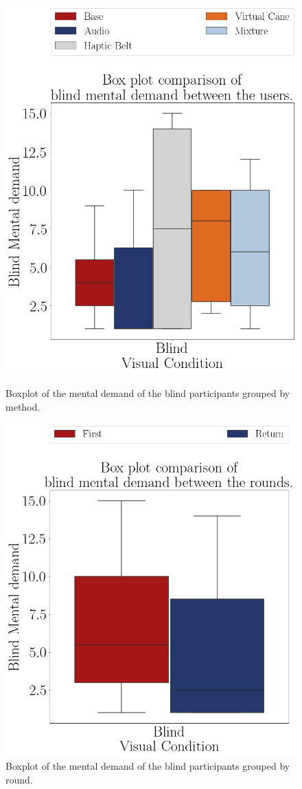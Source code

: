\begin{figure}[!htb]
    \centering
    \begin{minipage}{0.45\textwidth}
        \centering
        \includegraphics[width = 0.8\linewidth]{Resultados/Nasa/Figuras/png/boxplot_md_blind_scene.png}
        \caption{Boxplot of the mental demand of the blind participants grouped by method.}
        \label{fig:boxplot_md_blind_scene}
    \end{minipage}
    \begin{minipage}{0.45\textwidth}
        \centering
        \includegraphics[width = 0.8\linewidth]{Resultados/Nasa/Figuras/png/boxplot_md_blind_rounds.png}
        \caption{Boxplot of the mental demand of the blind participants grouped by round.}
        \label{fig:boxplot_md_blind_rounds}
    \end{minipage}
\end{figure}

